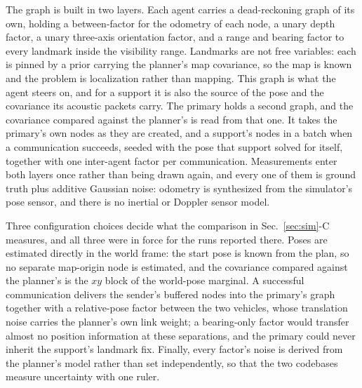 \documentclass[letterpaper, 10 pt, conference]{ieeeconf}
\theoremstyle{remark}
\begin{document}
The graph is built in two layers. Each agent carries a dead-reckoning graph of
its own, holding a between-factor for the odometry of each node, a unary depth
factor, a unary three-axis orientation factor, and a range and bearing factor
to every landmark inside the visibility range. Landmarks are not free
variables: each is pinned by a prior carrying the planner's map covariance, so
the map is known and the problem is localization rather than mapping. This
graph is what the agent steers on, and for a support it is also the source of
the pose and the covariance its acoustic packets carry. The primary holds a
second graph, and the covariance compared against the planner's is read from
that one. It takes the primary's own nodes as they are created, and a
support's nodes in a batch when a communication succeeds, seeded with the pose
that support solved for itself, together with one inter-agent factor per
communication. Measurements enter both layers once rather than being drawn
again, and every one of them is ground truth plus additive Gaussian noise:
odometry is synthesized from the simulator's pose sensor, and there is no
inertial or Doppler sensor model.

Three configuration choices decide what the comparison in
Sec.~\ref{sec:sim}-C measures, and all three were in force for the runs
reported there. Poses are estimated directly in the world frame: the start
pose is known from the plan, so no separate map-origin node is estimated, and
the covariance compared against the planner's is the $xy$ block of the
world-pose marginal. A successful communication delivers the sender's
buffered nodes into the primary's graph together with a relative-pose factor
between the two vehicles, whose translation noise carries the planner's own
link weight; a bearing-only factor would transfer almost no position
information at these separations, and the primary could never inherit the
support's landmark fix. Finally, every factor's noise is derived from the
planner's model rather than set independently, so that the two codebases
measure uncertainty with one ruler.
\end{document}
